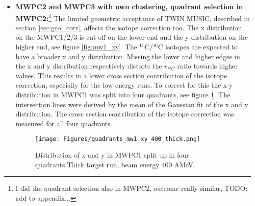 \begin{itemize}
\item \textbf{MWPC2 and MWPC3 with own clustering, quadrant selection in MWPC2:}\footnote{I did the quadrant selection also in MWPC2, outcome really similar, TODO: add to appendix...}\newline
The limited geometric acceptance of TWIN MUSIC, described in section \ref{sec:geo_corr}, affects the isotope correction too. The x distribution on the MWPC1/2/3 is cut off on the lower end and the y distribution on the higher end, see figure \ref{fig:mw1_xy}. The $^{11}$C/$^{10}$C isotopes are expected to have a broader x and y distribution. Missing the lower and higher edges in the x and y distribution respectively distorts the ${r_{^{12}C}}$ ratio towards higher values. This results in a lower cross section contribution of the isotope correction, especially for the low energy runs. To correct for this the x-y distribution in MWPC1 was split into four quadrants, see figure \ref{fig:mw1_xy_quadrants}. The intersection lines were derived by the mean of the Gaussian fit of the x and y distribution. The cross section contribution of the isotope correction was measured for all four quadrants.
\begin{figure}[htpb]
    \centering
    \texttt{[image: Figures/quadrants\_mw1\_xy\_400\_thick.png]}
    \caption{
   	 Distribution of x and y in MWPC1 split up in four quadrants.Thick target run, beam energy 400 AMeV. 
     }
    \label{fig:mw1_xy_quadrants}
\end{figure}
\end{itemize}
\newpage


